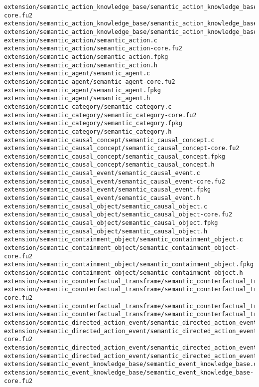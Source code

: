 \begin{lstlisting}
extension/semantic_action_knowledge_base/semantic_action_knowledge_base-core.fu2
extension/semantic_action_knowledge_base/semantic_action_knowledge_base.fpkg
extension/semantic_action_knowledge_base/semantic_action_knowledge_base.h
extension/semantic_action/semantic_action.c
extension/semantic_action/semantic_action-core.fu2
extension/semantic_action/semantic_action.fpkg
extension/semantic_action/semantic_action.h
extension/semantic_agent/semantic_agent.c
extension/semantic_agent/semantic_agent-core.fu2
extension/semantic_agent/semantic_agent.fpkg
extension/semantic_agent/semantic_agent.h
extension/semantic_category/semantic_category.c
extension/semantic_category/semantic_category-core.fu2
extension/semantic_category/semantic_category.fpkg
extension/semantic_category/semantic_category.h
extension/semantic_causal_concept/semantic_causal_concept.c
extension/semantic_causal_concept/semantic_causal_concept-core.fu2
extension/semantic_causal_concept/semantic_causal_concept.fpkg
extension/semantic_causal_concept/semantic_causal_concept.h
extension/semantic_causal_event/semantic_causal_event.c
extension/semantic_causal_event/semantic_causal_event-core.fu2
extension/semantic_causal_event/semantic_causal_event.fpkg
extension/semantic_causal_event/semantic_causal_event.h
extension/semantic_causal_object/semantic_causal_object.c
extension/semantic_causal_object/semantic_causal_object-core.fu2
extension/semantic_causal_object/semantic_causal_object.fpkg
extension/semantic_causal_object/semantic_causal_object.h
extension/semantic_containment_object/semantic_containment_object.c
extension/semantic_containment_object/semantic_containment_object-core.fu2
extension/semantic_containment_object/semantic_containment_object.fpkg
extension/semantic_containment_object/semantic_containment_object.h
extension/semantic_counterfactual_transframe/semantic_counterfactual_transframe.c
extension/semantic_counterfactual_transframe/semantic_counterfactual_transframe-core.fu2
extension/semantic_counterfactual_transframe/semantic_counterfactual_transframe.fpkg
extension/semantic_counterfactual_transframe/semantic_counterfactual_transframe.h
extension/semantic_directed_action_event/semantic_directed_action_event.c
extension/semantic_directed_action_event/semantic_directed_action_event-core.fu2
extension/semantic_directed_action_event/semantic_directed_action_event.fpkg
extension/semantic_directed_action_event/semantic_directed_action_event.h
extension/semantic_event_knowledge_base/semantic_event_knowledge_base.c
extension/semantic_event_knowledge_base/semantic_event_knowledge_base-core.fu2

\end{lstlisting}
